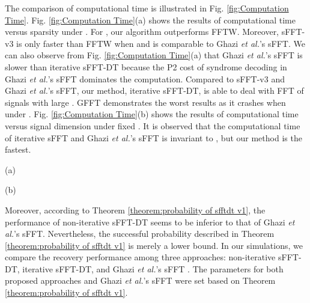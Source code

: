 \documentclass[journal,onecolumn,11pt]{IEEEtran}
\begin{document}
The comparison of computational time is illustrated in Fig. \ref{fig:Computation Time}.
Fig. \ref{fig:Computation Time}(a) shows the results of computational time versus sparsity under .
For , our algorithm outperforms FFTW.
Moreover, sFFT-v3 \cite{Haitham2012}\cite{Haitham2012_1} is only faster than FFTW when  and is comparable to Ghazi {\em et al.}'s sFFT.
We can also observe from Fig. \ref{fig:Computation Time}(a) that Ghazi {\em et al.}'s sFFT is slower than iterative sFFT-DT because the P2 cost of syndrome decoding in Ghazi {\em et al.}'s sFFT dominates the computation.
Compared to sFFT-v3 and Ghazi {\em et al.}'s sFFT, our method, iterative sFFT-DT, is able to deal with FFT of signals with large .
GFFT demonstrates the worst results as it crashes when  under .
Fig. \ref{fig:Computation Time}(b) shows the results of computational time versus signal dimension under fixed .
It is observed that the computational time of iterative sFFT and Ghazi {\em et al.}'s sFFT is invariant to , but our method is the fastest.

\begin{figure*}[!t]
\begin{minipage}[b]{.48\linewidth}
  \centerline{(a)}
\end{minipage}
\begin{minipage}[b]{.48\linewidth}
  \centerline{(b)}
\end{minipage}
\hfill
\caption{Comparison of computational time for exact K-sparse signals. (a) Computational time vs. sparsity under . (b) Computational time vs. signal dimension under  and .}
\label{fig:Computation Time}
\end{figure*}

Moreover, according to Theorem \ref{theorem:probability of sfftdt v1}, the performance of non-iterative sFFT-DT seems to be inferior to that of Ghazi {\em et al.}'s sFFT.
Nevertheless, the successful probability described in Theorem \ref{theorem:probability of sfftdt v1} is merely a lower bound.
In our simulations, we compare the recovery performance among three approaches: non-iterative sFFT-DT, iterative sFFT-DT, and Ghazi {\em et al.}'s sFFT \cite{Ghazi2013}.
The parameters for both proposed approaches and Ghazi {\em et al.}'s sFFT were set based on Theorem \ref{theorem:probability of sfftdt v1}.
\end{document}
